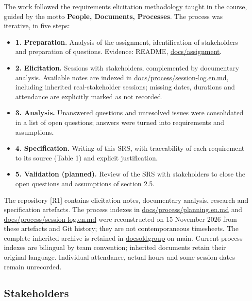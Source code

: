 \documentclass[11pt,a4paper]{article}
\begin{document}
The work followed the requirements elicitation methodology taught in the course, guided by the motto \textbf{People, Documents, Processes}. The process was iterative, in five steps:

\begin{itemize}
  \item \textbf{1. Preparation.} Analysis of the assignment, identification of stakeholders and preparation of questions. Evidence: README, \url{docs/assignment}.
  \item \textbf{2. Elicitation.} Sessions with stakeholders, complemented by documentary analysis. Available notes are indexed in \url{docs/process/session-log.en.md}, including inherited real-stakeholder sessions; missing dates, durations and attendance are explicitly marked as not recorded.
  \item \textbf{3. Analysis.} Unanswered questions and unresolved issues were consolidated in a list of open questions; answers were turned into requirements and assumptions.
  \item \textbf{4. Specification.} Writing of this SRS, with traceability of each requirement to its source (Table 1) and explicit justification.
  \item \textbf{5. Validation (planned).} Review of the SRS with stakeholders to close the open questions and assumptions of section 2.5.
\end{itemize}
The repository [R1] contains elicitation notes, documentary analysis, research and specification artefacts. The process indexes in \mbox{\url{docs/process/planning.en.md}} and \mbox{\url{docs/process/session-log.en.md}} were reconstructed on 15 November 2026 from these artefacts and Git history; they are not contemporaneous timesheets. The complete inherited archive is retained in \url{docsoldgroup} on main. Current process indexes are bilingual by team convention; inherited documents retain their original language. Individual attendance, actual hours and some session dates remain unrecorded.


\subsection{Stakeholders}
\end{document}
